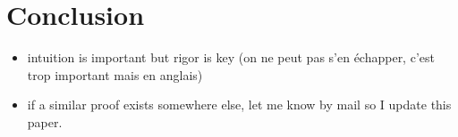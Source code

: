 \documentclass[10pt]{article}
\theoremstyle{definition}
\begin{document}
\section{Conclusion}

\begin{itemize}
    \item intuition is important but rigor is key (on ne peut pas s'en échapper, c'est trop important mais en anglais)
    \item if a similar proof exists somewhere else, let me know by mail so I update this paper.
\end{itemize}

\newpage


\end{document}
